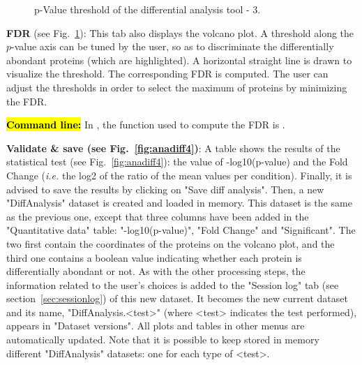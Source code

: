 \documentclass[12pt]{article}
\begin{document}
{\begin {figure}
\centering
{}
\caption{p-Value threshold of the differential analysis tool - 3.}
\label{fig:anadiff3}
\end {figure}

\textbf{FDR} (see Fig.~\ref{fig:anadiff3}): This tab also displays the 
volcano plot. A threshold along the $p$-value axis can be tuned by the user, 
so as to discriminate the differentially abondant proteins (which are 
highlighted). A horizontal straight line is drawn to visualize the threshold. 
The corresponding FDR is computed. The user can adjust the thresholds in 
order to select the maximum of proteins by minimizing the FDR.


\hl{\bf Command line:} In , the function used to compute the 
FDR is .


\textbf{Validate \& save (see Fig.~\ref{fig:anadiff4})}: 
A table shows the results of the statistical test (see 
Fig.~\ref{fig:anadiff4}): the value of -log10(p-value) and the Fold Change 
(\emph{i.e.} the log2 of the ratio of the mean values per condition). Finally, 
it is advised to save the results by clicking on "Save diff analysis". Then, 
a new "DiffAnalysis" dataset is created and loaded in memory. This dataset 
is the same as the previous one, except that three columns have been added in 
the "Quantitative data" table: "-log10(p-value)",  "Fold Change" and 
"Significant". The two first contain the coordinates of the proteins on the 
volcano plot, and the third one contains a boolean value indicating whether 
each protein is differentially abondant or not. As with the other processing 
steps, the information related to the user's choices is added to the 
"Session log" tab (see section~\ref{sec:sessionlog}) of this new dataset.
It becomes the new current dataset and its name, "DiffAnalysis.<test>" (where 
<test> indicates the test performed), appears in "Dataset versions". All 
plots and tables in other menus are automatically updated. Note that it is 
possible to keep stored in memory different "DiffAnalysis" datasets: one for 
each type of <test>.


}
\end{document}
